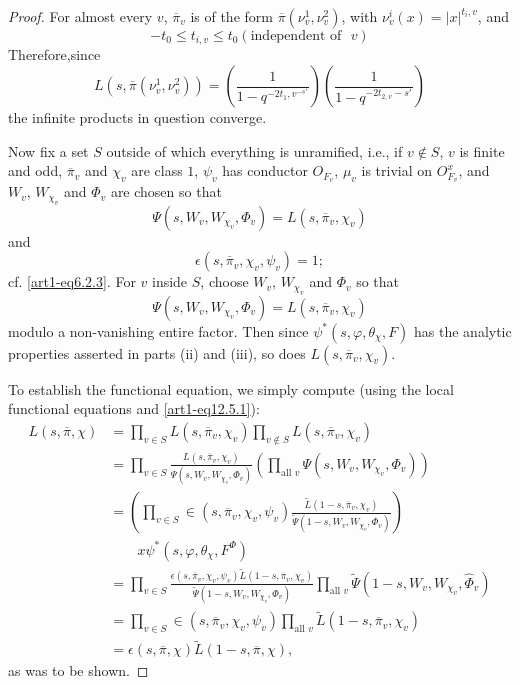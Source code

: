 \begin{proof}
For almost every $v$, $\overline{\pi}_{v}$ is of the form $\overline{\pi}(\nu^{1}_{v},\nu^{2}_{v})$, with $\nu^{i}_{v}(x)=|x|^{t_{i},v}$, and
$$
-t_{0}\leq t_{i,v}\leq t_{0}(\text{independent of~ } v)
$$
\eject
\noindent
Therefore,\pageoriginale since
$$
L(s,\overline{\pi}(\nu^{1}_{v},\nu^{2}_{v}))=\left(\dfrac{1}{1-q^{-2t_{1},v^{-s'}}}\right)\left(\dfrac{1}{1-q^{-2t_{2,v}-s'}}\right)
$$
the infinite products in question converge.

Now fix a set $S$ outside of which everything is unramified, i.e., if $v\not\in S$, $v$ is finite and odd, $\overline{\pi}_{v}$ and $\chi_{v}$ are class $1$, $\psi_{v}$ has conductor $O_{F_{v}}$, $\mu_{v}$ is trivial on $O^{x}_{F_{v}}$, and $W_{v}$, $W_{\chi_{v}}$ and $\Phi_{v}$ are chosen so that
$$
\Psi(s,W_{v},W_{\chi_{v}},\Phi_{v})=L(s,\overline{\pi}_{v},\chi_{v})
$$
and
$$
\epsilon(s,\overline{\pi}_{v},\chi_{v},\psi_{v})=1;
$$
cf. \eqref{art1-eq6.2.3}. For $v$ inside $S$, choose $W_{v}$, $W_{\chi_{v}}$ and $\Phi_{v}$ so that 
$$
\Psi(s,W_{v},W_{\chi_{v}},\Phi_{v})=L(s,\overline{\pi}_{v},\chi_{v})
$$ 
modulo a non-vanishing entire factor. Then since $\psi^{*}(s,\varphi,\theta_{\chi},F)$ has the analytic properties asserted in parts (ii) and (iii), so does $L(s,\overline{\pi}_{v},\chi_{v})$.

To establish the functional equation, we simply compute (using the local functional equations and \eqref{art1-eq12.5.1}):
\begin{align*}
L(s,\overline{\pi},\chi) &= \prod\limits_{v\in S}L(s,\overline{\pi}_{v},\chi_{v})\prod\limits_{v\not\in S}L(s,\overline{\pi}_{v},\chi_{v})\\[4pt]
&= \prod\limits_{v\in S} \frac{L(s,\overline{\pi}_{v},\chi_{v})}{\Psi(s,W_{v},W_{\chi_{v}},\Phi_{v})}\left(\prod\limits_{\text{all~} v}\Psi(s,W_{v},W_{\chi_{v}},\Phi_{v})\right)\\[4pt]
&= \left(\prod\limits_{v\in S}\in (s,\overline{\pi}_{v},\chi_{v},\psi_{v})\frac{\widetilde{L}(1-s,\overline{\pi}_{v},\chi_{v})}{\widetilde{\Psi}(1-s,W_{v},W_{\chi_{v}},\Phi_{v})}\right)\\[4pt]
&\qquad x\psi^{*}(s,\varphi,\theta_{\chi},F^{\Phi})\\[4pt]
&=\prod\limits_{v\in S}\frac{\epsilon(s,\overline{\pi}_{v},\chi_{v},\psi_{v})\widetilde{L}(1-s,\overline{\pi}_{v},\chi_{v})}{\widetilde{\Psi}(1-s,W_{v},W_{\chi_{v}},\Phi_{v})}\prod\limits_{\text{all~}v}\widetilde{\Psi}(1-s,W_{v},W_{\chi_{v}},\widehat{\Phi}_{v})\\[4pt]
&= \prod\limits_{v\in S}\in(s,\overline{\pi}_{v},\chi_{v},\psi_{v})\prod\limits_{\text{all~}v}\widetilde{L}(1-s,\overline{\pi}_{v},\chi_{v})\\[4pt]
&= \epsilon(s,\overline{\pi},\chi)\widetilde{L}(1-s,\overline{\pi},\chi),
\end{align*}
as was to be shown.
\end{proof}

